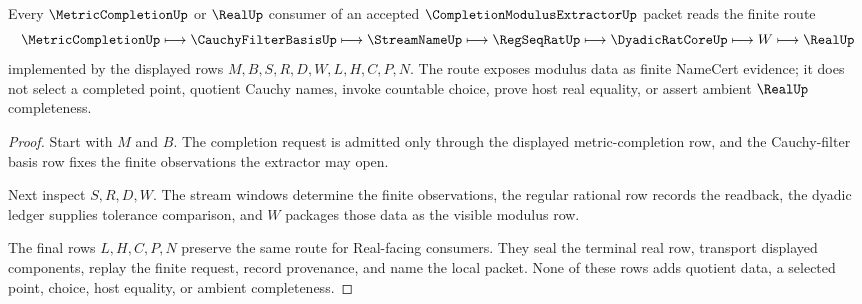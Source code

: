 \begin{theorem}
\label{thm:completion-modulus-extractor-route}
Every $\MetricCompletionUp$ or $\RealUp$ consumer of an accepted $\CompletionModulusExtractorUp$ packet reads the finite route
$$
\MetricCompletionUp \longmapsto \CauchyFilterBasisUp \longmapsto \StreamNameUp \longmapsto \RegSeqRatUp \longmapsto \DyadicRatCoreUp \longmapsto W \longmapsto \RealUp
$$
implemented by the displayed rows $M,B,S,R,D,W,L,H,C,P,N$. The route exposes modulus data as finite NameCert evidence; it does not select a completed point, quotient Cauchy names, invoke countable choice, prove host real equality, or assert ambient $\RealUp$ completeness.
\end{theorem}
\begin{proof}
Start with $M$ and $B$. The completion request is admitted only through the displayed metric-completion row, and the Cauchy-filter basis row fixes the finite observations the extractor may open.

Next inspect $S,R,D,W$. The stream windows determine the finite observations, the regular rational row records the readback, the dyadic ledger supplies tolerance comparison, and $W$ packages those data as the visible modulus row.

The final rows $L,H,C,P,N$ preserve the same route for Real-facing consumers. They seal the terminal real row, transport displayed components, replay the finite request, record provenance, and name the local packet. None of these rows adds quotient data, a selected point, choice, host equality, or ambient completeness.
\end{proof}


